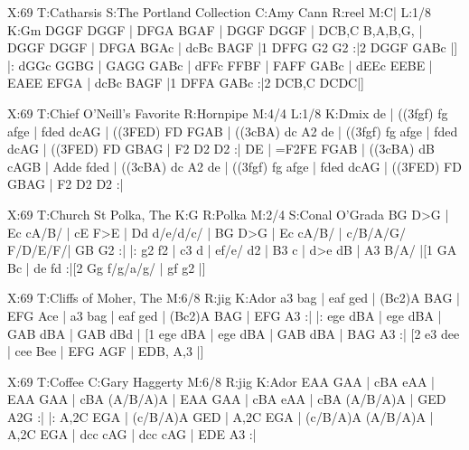 \documentclass{article}
\begin{document}
\begin{abc}[name]
X:69
T:Catharsis
S:The Portland Collection
C:Amy Cann
R:reel
M:C|
L:1/8
K:Gm
DGGF DGGF | DFGA BGAF | DGGF DGGF | DCB,C B,A,B,G, |
DGGF DGGF | DFGA BGAc | dcBc BAGF |1 DFFG G2 G2 :|2 DGGF GABc |]
|: dGGc GGBG | GAGG GABc | dFFc FFBF | FAFF GABc |
dEEc EEBE | EAEE EFGA | dcBc BAGF |1 DFFA GABc :|2 DCB,C DCDC|]
\end{abc}

\begin{abc}[name]
X:69
T:Chief O'Neill's Favorite
R:Hornpipe
M:4/4
L:1/8
K:Dmix
de | ((3fgf) fg afge | fded dcAG | ((3FED) FD FGAB | ((3cBA) dc A2 de |
((3fgf) fg afge | fded dcAG | ((3FED) FD GBAG | F2 D2 D2 :|
DE | =F2FE FGAB | ((3cBA) dB cAGB | Adde fded | ((3cBA) dc A2 de |
((3fgf) fg afge | fded dcAG | ((3FED) FD GBAG | F2 D2 D2 :|
\end{abc}

\begin{abc}[name]
X:69
T:Church St Polka, The
K:G
R:Polka
M:2/4
S:Conal O'Grada
BG D>G | Ec cA/B/ | cE F>E | Dd d/e/d/c/ |
BG D>G | Ec cA/B/ | c/B/A/G/ F/D/E/F/| GB G2 :|
|: g2 f2 | c3 d | ef/e/ d2 | B3 c |
d>e dB | A3 B/A/ |[1 GA Bc | de fd :|[2 Gg f/g/a/g/ | gf g2 |]
\end{abc}

\begin{abc}[name]
X:69
T:Cliffs of Moher, The
M:6/8
R:jig
K:Ador
a3 bag | eaf ged | ({B}c2)A BAG | EFG Ace |
a3 bag | eaf ged | ({B}c2)A BAG | EFG A3 :|
|: ege dBA | ege dBA | GAB dBA | GAB dBd |
[1 ege dBA | ege dBA | GAB dBA | BAG A3 :|
[2 e3 dee | cee Bee | EFG AGF | EDB, A,3 |]
\end{abc}

\begin{abc}[name]
X:69
T:Coffee
C:Gary Haggerty
M:6/8
R:jig
K:Ador
EAA GAA | cBA eAA | EAA GAA | cBA (A/B/A)A |
EAA GAA | cBA eAA | cBA (A/B/A)A | GED A2G :|
|: A,2C EGA | (c/B/A)A GED | A,2C EGA | (c/B/A)A (A/B/A)A |
A,2C EGA | dcc cAG | dcc cAG | EDE A3 :|
\end{abc}
\end{document}
